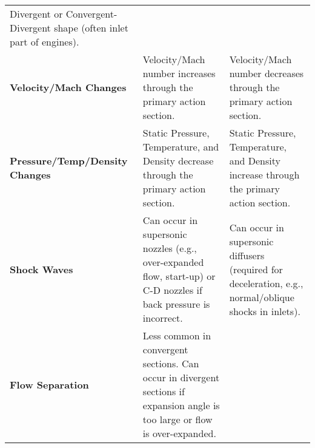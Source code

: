 \begin{longtable}[]{@{}lll@{}}
\begin{minipage}[t]{0.41\columnwidth}
Divergent or Convergent-Divergent shape (often inlet part of
engines).\strut
\end{minipage}\tabularnewline
\begin{minipage}[t]{0.12\columnwidth}\raggedright
\textbf{Velocity/Mach Changes}\strut
\end{minipage} & \begin{minipage}[t]{0.39\columnwidth}\raggedright
Velocity/Mach number increases through the primary action section.\strut
\end{minipage} & \begin{minipage}[t]{0.41\columnwidth}\raggedright
Velocity/Mach number decreases through the primary action section.\strut
\end{minipage}\tabularnewline
\begin{minipage}[t]{0.12\columnwidth}\raggedright
\textbf{Pressure/Temp/Density Changes}\strut
\end{minipage} & \begin{minipage}[t]{0.39\columnwidth}\raggedright
Static Pressure, Temperature, and Density decrease through the primary
action section.\strut
\end{minipage} & \begin{minipage}[t]{0.41\columnwidth}\raggedright
Static Pressure, Temperature, and Density increase through the primary
action section.\strut
\end{minipage}\tabularnewline
\begin{minipage}[t]{0.12\columnwidth}\raggedright
\textbf{Shock Waves}\strut
\end{minipage} & \begin{minipage}[t]{0.39\columnwidth}\raggedright
Can occur in supersonic nozzles (e.g., over-expanded flow, start-up) or
C-D nozzles if back pressure is incorrect.\strut
\end{minipage} & \begin{minipage}[t]{0.41\columnwidth}\raggedright
Can occur in supersonic diffusers (required for deceleration, e.g.,
normal/oblique shocks in inlets).\strut
\end{minipage}\tabularnewline
\begin{minipage}[t]{0.12\columnwidth}\raggedright
\textbf{Flow Separation}\strut
\end{minipage} & \begin{minipage}[t]{0.39\columnwidth}\raggedright
Less common in convergent sections. Can occur in divergent sections if
expansion angle is too large or flow is over-expanded.\strut
\end{minipage} & \begin{minipage}[t]{0.41\columnwidth}\raggedright

\end{minipage}
\end{longtable}
